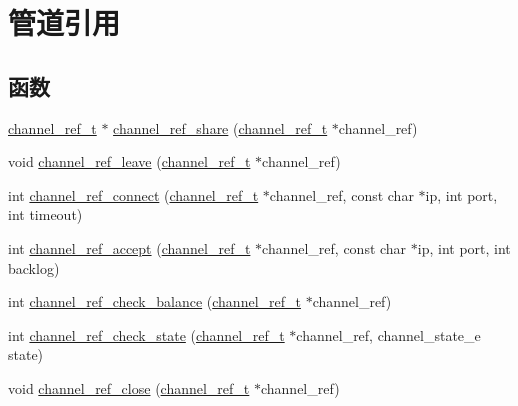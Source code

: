 \hypertarget{group___xE7_xAE_xA1_xE9_x81_x93_xE5_xBC_x95_xE7_x94_xA8}{}\section{管道引用}
\label{group___xE7_xAE_xA1_xE9_x81_x93_xE5_xBC_x95_xE7_x94_xA8}
\subsection*{函数}
\begin{DoxyCompactItemize}
\item 
\hyperlink{struct__channel__ref__t}{channel\+\_\+ref\+\_\+t} $\ast$ \hyperlink{group___xE7_xAE_xA1_xE9_x81_x93_xE5_xBC_x95_xE7_x94_xA8_ga7b76c4078bbe8272206a5d7467ccd4ed}{channel\+\_\+ref\+\_\+share} (\hyperlink{struct__channel__ref__t}{channel\+\_\+ref\+\_\+t} $\ast$channel\+\_\+ref)
\item 
void \hyperlink{group___xE7_xAE_xA1_xE9_x81_x93_xE5_xBC_x95_xE7_x94_xA8_gab4248c6e10ac538b5d37b927bbe39ef1}{channel\+\_\+ref\+\_\+leave} (\hyperlink{struct__channel__ref__t}{channel\+\_\+ref\+\_\+t} $\ast$channel\+\_\+ref)
\item 
int \hyperlink{group___xE7_xAE_xA1_xE9_x81_x93_xE5_xBC_x95_xE7_x94_xA8_ga1a8d1f5550cf26313cbb6575e8b2a32c}{channel\+\_\+ref\+\_\+connect} (\hyperlink{struct__channel__ref__t}{channel\+\_\+ref\+\_\+t} $\ast$channel\+\_\+ref, const char $\ast$ip, int port, int timeout)
\item 
int \hyperlink{group___xE7_xAE_xA1_xE9_x81_x93_xE5_xBC_x95_xE7_x94_xA8_gae9ae0ae2a42eabf6a544ce4e0f001c9e}{channel\+\_\+ref\+\_\+accept} (\hyperlink{struct__channel__ref__t}{channel\+\_\+ref\+\_\+t} $\ast$channel\+\_\+ref, const char $\ast$ip, int port, int backlog)
\item 
int \hyperlink{group___xE7_xAE_xA1_xE9_x81_x93_xE5_xBC_x95_xE7_x94_xA8_gae003fde214ddbf4feec22ddb89b8257c}{channel\+\_\+ref\+\_\+check\+\_\+balance} (\hyperlink{struct__channel__ref__t}{channel\+\_\+ref\+\_\+t} $\ast$channel\+\_\+ref)
\item 
int \hyperlink{group___xE7_xAE_xA1_xE9_x81_x93_xE5_xBC_x95_xE7_x94_xA8_gadddbdc58824b567334d46493decc90f8}{channel\+\_\+ref\+\_\+check\+\_\+state} (\hyperlink{struct__channel__ref__t}{channel\+\_\+ref\+\_\+t} $\ast$channel\+\_\+ref, channel\+\_\+state\+\_\+e state)
\item 
void \hyperlink{group___xE7_xAE_xA1_xE9_x81_x93_xE5_xBC_x95_xE7_x94_xA8_ga49d6ba5f0b9aad95ae5c5710dca392a1}{channel\+\_\+ref\+\_\+close} (\hyperlink{struct__channel__ref__t}{channel\+\_\+ref\+\_\+t} $\ast$channel\+\_\+ref)

\end{DoxyCompactItemize}

